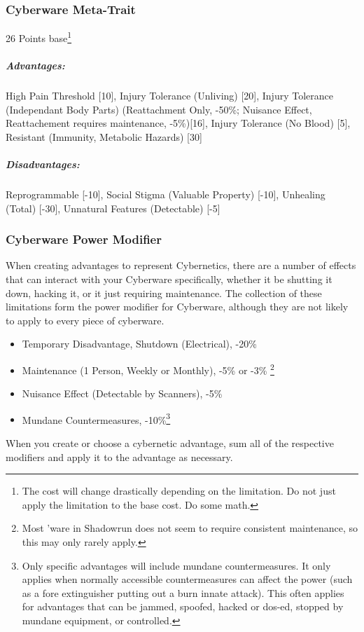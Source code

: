 \begin{multicols*}{3}
	\subsubsection*{Cyberware Meta-Trait}
	\begin{flushright}
		26 Points base\footnote{The cost will change drastically depending on the limitation. Do not just apply the limitation to the base cost. Do some math.}
	\end{flushright}
	\subparagraph{Advantages:}
	High Pain Threshold [10], Injury Tolerance (Unliving) [20], Injury Tolerance (Independant Body Parts) (Reattachment Only, -50\%; Nuisance Effect, Reattachement requires maintenance, -5\%)[16], Injury Tolerance (No Blood) [5], Resistant (Immunity, Metabolic Hazards) [30]
	\subparagraph{Disadvantages:}
	Reprogrammable [-10], Social Stigma (Valuable Property) [-10], Unhealing (Total) [-30], Unnatural Features (Detectable) [-5]
	
	\subsubsection{Cyberware Power Modifier}
	
	When creating advantages to represent Cybernetics, there are a number of effects that can interact with your Cyberware specifically, whether it be shutting it down, hacking it, or it just requiring maintenance. The collection of these limitations form the power modifier for Cyberware, although they are not likely to apply to every piece of cyberware.
	
	\begin{itemize}
		\item Temporary Disadvantage, Shutdown (Electrical), -20\%
		\item Maintenance (1 Person, Weekly or Monthly), -5\% or -3\% \footnote{Most 'ware in Shadowrun does not seem to require consistent maintenance, so this may only rarely apply.}
		\item Nuisance Effect (Detectable by Scanners), -5\%
		\item Mundane Countermeasures, -10\%\footnote{Only specific advantages will include mundane countermeasures. It only applies when normally accessible countermeasures can affect the power (such as a fore extinguisher putting out a burn innate attack). This often applies for advantages that can be jammed, spoofed, hacked or dos-ed, stopped by mundane equipment, or controlled.}
	\end{itemize}
	
	When you create or choose a cybernetic advantage, sum all of the respective modifiers and apply it to the advantage as necessary.
	

\end{multicols*}
